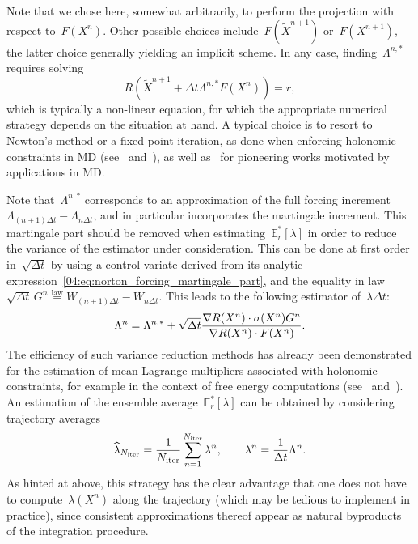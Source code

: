 Note that we chose here, somewhat arbitrarily, to perform the projection with respect to~$F(X^n)$. Other possible choices include~$F(\widetilde{X}^{n+1})$ or~$F(X^{n+1})$, the latter choice generally yielding an implicit scheme. In any case, finding~$\Lambda^{n,*}$ requires solving
\[R\left(\widetilde{X}^{n+1} +\Delta t\Lambda^{n,*} F(X^n)\right)=r,\]
which is typically a non-linear equation, for which the appropriate numerical strategy depends on the situation at hand. A typical choice is to resort to Newton's method or a fixed-point iteration, as done when enforcing holonomic constraints in MD (see~\cite[Section VII.1]{HWL06} and~\cite[Chapter~7]{LR04}), as well as~\cite{RCB77,A83} for pioneering works motivated by applications in MD.

Note that~$\Lambda^{n,*}$ corresponds to an approximation of the full forcing increment~$\Lambda_{(n+1)\Delta t}-\Lambda_{n\Delta t}$, and in particular incorporates the martingale increment. This martingale part should be removed when estimating~$\mathbb E_r^*[\lambda]$ in order to reduce the variance of the estimator under consideration. This can be done at first order in~$\sqrt{\Delta t}$ by using a control variate derived from its analytic expression~\eqref{04:eq:norton_forcing_martingale_part}, and the equality in law~$\sqrt{\Delta t} \, G^n \overset{\mathrm{law}}{=}W_{(n+1)\Delta t}-W_{n\Delta t}$. This leads to the following estimator of~$\lambda\Delta t$:
\begin{equation}
\label{04:eq:norton_var_reduction}
    \Lambda^{n} = \Lambda^{n,*}+\sqrt{{\Delta t}}\frac{\nabla R(X^n)\cdot \sigma(X^n)G^n}{\nabla R(X^n)\cdot F(X^n)}.
\end{equation}
The efficiency of such variance reduction methods has already been demonstrated for the estimation of mean Lagrange multipliers associated with holonomic constraints, for example in the context of free energy computations (see~\cite{CLVE08} and~\cite[Remark~3.33]{LRS10}).
An estimation of the ensemble average~$\mathbb E_r^*[\lambda]$ can be obtained by considering trajectory averages
\begin{equation}
    \label{04:eq:norton_lambda_n_definition}
    \widehat{\lambda}_{N_{\mathrm{iter}}} = \frac{1}{N_{\mathrm{iter}}} \sum_{n=1}^{N_{\mathrm{iter}}} \lambda^n,\qquad\lambda^{n} = \frac{1}{{\Delta t}}\Lambda^n.
\end{equation}
As hinted at above, this strategy has the clear advantage that one does not have to compute~$\lambda(X^n)$ along the trajectory (which may be tedious to implement in practice), since consistent approximations thereof appear as natural byproducts of the integration procedure.

